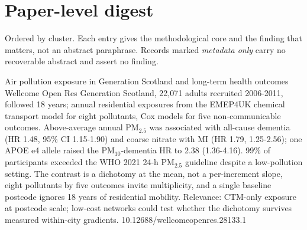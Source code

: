 \documentclass[10pt]{article}
\begin{document}
\vspace{2mm}


\vspace{4mm}

\par{}\baselineskip{}\baselineskip
\section*{\sffamily\bfseries\color{Deep}Paper-level digest}
\vspace{-1.5mm}{\color{Amber}\rule{\linewidth}{1.1pt}}\vspace{2.5mm}

{\fontsize{7.4}{9}\selectfont\color{Slate}Ordered by cluster. Each entry gives the
methodological core and the finding that matters, not an abstract paraphrase. Records
marked \textit{metadata only} carry no recoverable abstract and assert no finding.\par}


{Air pollution exposure in Generation Scotland and long-term health outcomes}
{Wellcome Open Res}
{Generation Scotland, 22,071 adults recruited 2006-2011, followed 18 years; annual residential exposures from the EMEP4UK chemical transport model for eight pollutants, Cox models for five non-communicable outcomes. Above-average annual PM$_{2.5}$ was associated with all-cause dementia (HR 1.48, 95\% CI 1.15-1.90) and coarse nitrate with MI (HR 1.79, 1.25-2.56); one APOE e4 allele raised the PM$_{10}$-dementia HR to 2.38 (1.36-4.16). 99\% of participants exceeded the WHO 2021 24-h PM$_{2.5}$ guideline despite a low-pollution setting. The contrast is a dichotomy at the mean, not a per-increment slope, eight pollutants by five outcomes invite multiplicity, and a single baseline postcode ignores 18 years of residential mobility. Relevance: CTM-only exposure at postcode scale; low-cost networks could test whether the dichotomy survives measured within-city gradients.}
{10.12688/wellcomeopenres.28133.1}

\par{}\baselineskip{}\baselineskip
{}
\end{document}
